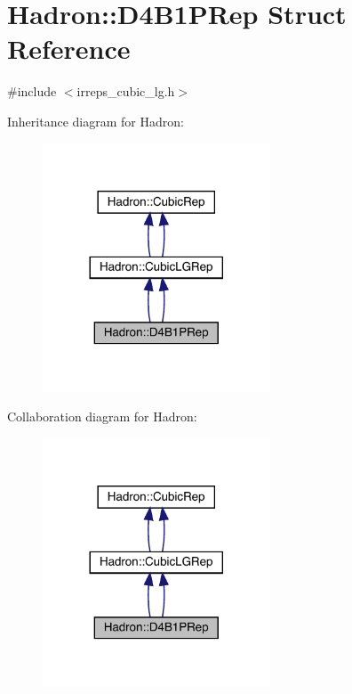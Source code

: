 \hypertarget{structHadron_1_1D4B1PRep}{}\section{Hadron\+:\+:D4\+B1\+P\+Rep Struct Reference}
\label{structHadron_1_1D4B1PRep}


{\ttfamily \#include $<$irreps\+\_\+cubic\+\_\+lg.\+h$>$}



Inheritance diagram for Hadron\+:\nopagebreak
\begin{figure}[H]
\begin{center}
\leavevmode
\includegraphics[width=192pt]{d6/d30/structHadron_1_1D4B1PRep__inherit__graph}
\end{center}
\end{figure}


Collaboration diagram for Hadron\+:\nopagebreak
\begin{figure}[H]
\begin{center}
\leavevmode
\includegraphics[width=192pt]{d7/d2e/structHadron_1_1D4B1PRep__coll__graph}
\end{center}
\end{figure}
